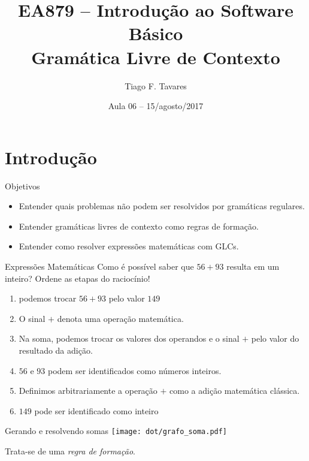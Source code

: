 \documentclass{beamer}
\title[06-Gramática Livre de Contexto]{EA879 -- Introdução ao Software Básico\\Gramática Livre de Contexto}
\author{Tiago F. Tavares}
\institute{FEEC -- UNICAMP}
\date{Aula 06 -- 15/agosto/2017}
\begin{document}
\begin{frame}
  \titlepage
\end{frame}


\section{Introdução}

\begin{frame}{Objetivos}
  \Large
  \begin{itemize}
    \item Entender quais problemas não podem ser resolvidos por gramáticas
       regulares.
    \item Entender gramáticas livres de contexto como regras de formação.
    \item Entender como resolver expressões matemáticas com GLCs.
  \end{itemize}
\end{frame}

\begin{frame}{Expressões Matemáticas}
\large
  Como é possível saber que $56 + 93$ resulta em um inteiro? Ordene as etapas do
  raciocínio!
  \begin{enumerate}
    \item podemos trocar $56 + 93$ pelo valor $149$

    \item O sinal $+$ denota uma operação matemática.
    \item Na soma, podemos trocar os valores dos operandos e o sinal $+$ pelo
      valor do resultado da adição.
    \item $56$ e $93$ podem ser identificados como números inteiros.

    \item Definimos arbitrariamente a operação $+$ como a adição matemática
      clássica.
    \item $149$ pode ser identificado como inteiro
  \end{enumerate}
\end{frame}

\begin{frame}{Gerando e resolvendo somas}
\large
\centering
  \texttt{[image: dot/grafo\_soma.pdf]}

  Trata-se de uma \textit{regra de formação}.
\end{frame}
\end{document}
